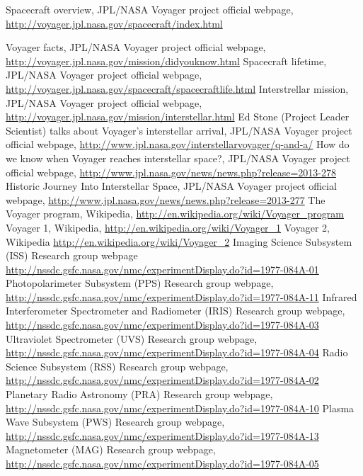 \documentclass[11pt,a4paper]{article}
\begin{document}
\begin{thebibliography}{99}
 Spacecraft overview, JPL/NASA Voyager project official webpage, \url{http://voyager.jpl.nasa.gov/spacecraft/index.html}

 Voyager facts, JPL/NASA Voyager project official webpage, \url{http://voyager.jpl.nasa.gov/mission/didyouknow.html}
 Spacecraft lifetime, JPL/NASA Voyager project official webpage, \url{http://voyager.jpl.nasa.gov/spacecraft/spacecraftlife.html}
 Interstrellar mission, JPL/NASA Voyager project official webpage, \url{http://voyager.jpl.nasa.gov/mission/interstellar.html}
 Ed Stone (Project Leader Scientist) talks about Voyager's interstellar arrival, JPL/NASA Voyager project official webpage, \url{http://www.jpl.nasa.gov/interstellarvoyager/q-and-a/}
 How do we know when Voyager reaches interstellar space?, JPL/NASA Voyager project official webpage, \url{http://www.jpl.nasa.gov/news/news.php?release=2013-278}
 Historic Journey Into Interstellar Space, JPL/NASA Voyager project official webpage, \url{http://www.jpl.nasa.gov/news/news.php?release=2013-277}
 The Voyager program, Wikipedia, \url{http://en.wikipedia.org/wiki/Voyager_program}
 Voyager 1, Wikipedia, \url{http://en.wikipedia.org/wiki/Voyager_1}
 Voyager 2, Wikipedia \url{http://en.wikipedia.org/wiki/Voyager_2}
 Imaging Science Subsystem (ISS) Research group webpage \url{http://nssdc.gsfc.nasa.gov/nmc/experimentDisplay.do?id=1977-084A-01}
 Photopolarimeter Subsystem (PPS) Research group webpage,  \url{http://nssdc.gsfc.nasa.gov/nmc/experimentDisplay.do?id=1977-084A-11}
 Infrared Interferometer Spectrometer and Radiometer (IRIS) Research group webpage,  \url{http://nssdc.gsfc.nasa.gov/nmc/experimentDisplay.do?id=1977-084A-03}
 Ultraviolet Spectrometer (UVS) Research group webpage,  \url{http://nssdc.gsfc.nasa.gov/nmc/experimentDisplay.do?id=1977-084A-04}
 Radio Science Subsystem (RSS) Research group webpage,  \url{http://nssdc.gsfc.nasa.gov/nmc/experimentDisplay.do?id=1977-084A-02}
 Planetary Radio Astronomy (PRA) Research group webpage,  \url{http://nssdc.gsfc.nasa.gov/nmc/experimentDisplay.do?id=1977-084A-10}
 Plasma Wave Subsystem (PWS) Research group webpage, \url{http://nssdc.gsfc.nasa.gov/nmc/experimentDisplay.do?id=1977-084A-13}
 Magnetometer (MAG) Research group webpage, \url{http://nssdc.gsfc.nasa.gov/nmc/experimentDisplay.do?id=1977-084A-05}

\end{thebibliography}
\end{document}
